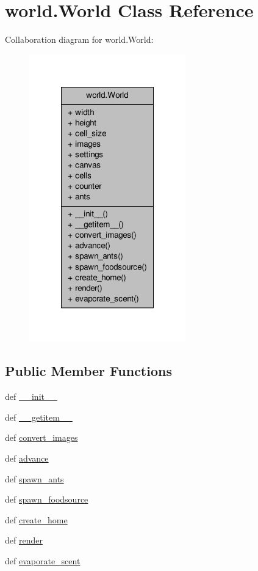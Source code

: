 \hypertarget{classworld_1_1World}{\section{world.\+World Class Reference}
\label{classworld_1_1World}
}


Collaboration diagram for world.\+World\+:\nopagebreak
\begin{figure}[H]
\begin{center}
\leavevmode
\includegraphics[width=192pt]{classworld_1_1World__coll__graph}
\end{center}
\end{figure}
\subsection*{Public Member Functions}
\begin{DoxyCompactItemize}
\item 
def \hyperlink{classworld_1_1World_a4351253668240be9d3a0d5bc2f1aa18f}{\+\_\+\+\_\+init\+\_\+\+\_\+}
\item 
def \hyperlink{classworld_1_1World_ad12e75d551845a567951b885d204153d}{\+\_\+\+\_\+getitem\+\_\+\+\_\+}
\item 
def \hyperlink{classworld_1_1World_add7ffc7d3af488f4ed006a401b842ca1}{convert\+\_\+images}
\item 
def \hyperlink{classworld_1_1World_a254dbfa03188d38b7e822c1a2e20a568}{advance}
\item 
def \hyperlink{classworld_1_1World_aaf7c311b1dbcac59ccff5e0319e14692}{spawn\+\_\+ants}
\item 
def \hyperlink{classworld_1_1World_af83c041eb0a9fee93eae12bb24038b0a}{spawn\+\_\+foodsource}
\item 
def \hyperlink{classworld_1_1World_a1dd90d1ccaa88b5e9bfdceed9dd65de6}{create\+\_\+home}
\item 
def \hyperlink{classworld_1_1World_a40aafbcc96e8592e314cf08068aba5f5}{render}
\item 
def \hyperlink{classworld_1_1World_a45f0825ea2f6b659d376fbc859aa208a}{evaporate\+\_\+scent}
\end{DoxyCompactItemize}
